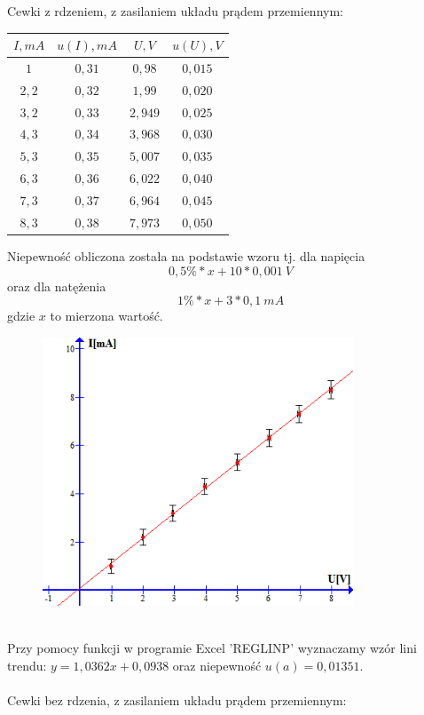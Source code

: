 \documentclass{article}
\begin{document}
Cewki z rdzeniem, z zasilaniem układu prądem przemiennym:
\begin{center}
    \begin{tabular}{|c|c|c|c|}
    \hline
$I,mA$ & $u(I), mA$ & $U,V$ & $u(U), V$\\ \hline
$1$ & $0,31$ & $0,98$ & $0,015$\\ \hline
$2,2$ & $0,32$ & $1,99$ & $0,020$\\ \hline
$3,2$ & $0,33$ & $2,949$ & $0,025$\\ \hline
$4,3$ & $0,34$ & $3,968$ & $0,030$\\ \hline
$5,3$ & $0,35$ & $5,007$ & $0,035$\\ \hline
$6,3$ & $0,36$ & $6,022$ & $0,040$\\ \hline
$7,3$ & $0,37$ & $6,964$ & $0,045$\\ \hline
$8,3$ & $0,38$ & $7,973$ & $0,050$\\ \hline
    \end{tabular}
\end{center}
Niepewność obliczona została na podstawie wzoru tj. dla napięcia
$$0,5\% * x + 10 * 0,001\ V $$
oraz dla natężenia
$$1\% * x + 3 * 0,1\ mA$$
gdzie $x$ to mierzona wartość.
\begin{figure}[ht]
\centering
\includegraphics[height=8cm]{wykres_2.png}
\end{figure}\\
Przy pomocy funkcji w programie Excel 'REGLINP' wyznaczamy wzór lini trendu: $y = 1,0362x + 0,0938$ oraz niepewność $u(a) = 0,01351$.\\\\
Cewki bez rdzenia, z zasilaniem układu prądem przemiennym:
\end{document}
